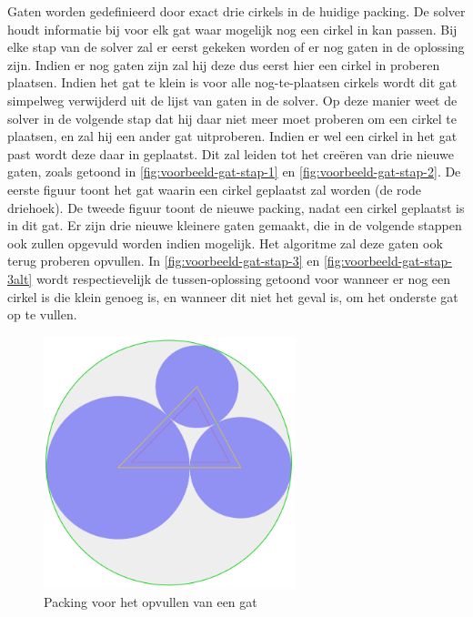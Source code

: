 \documentclass[12pt,a4paper,oneside]{book}
\begin{document}
Gaten worden gedefinieerd door exact drie cirkels in de huidige packing.
De solver houdt informatie bij voor elk gat waar mogelijk nog een cirkel in kan passen.
Bij elke stap van de solver zal er eerst gekeken worden of er nog gaten in de oplossing zijn.
Indien er nog gaten zijn zal hij deze dus eerst hier een cirkel in proberen plaatsen.
Indien het gat te klein is voor alle nog-te-plaatsen cirkels wordt dit gat simpelweg verwijderd uit de lijst van gaten in de solver.
Op deze manier weet de solver in de volgende stap dat hij daar niet meer moet proberen om een cirkel te plaatsen, en zal hij een ander gat uitproberen.
Indien er wel een cirkel in het gat past wordt deze daar in geplaatst.
Dit zal leiden tot het creëren van drie nieuwe gaten, zoals getoond in \autoref{fig:voorbeeld-gat-stap-1} en \autoref{fig:voorbeeld-gat-stap-2}.
De eerste figuur toont het gat waarin een cirkel geplaatst zal worden (de rode driehoek).
De tweede figuur toont de nieuwe packing, nadat een cirkel geplaatst is in dit gat.
Er zijn drie nieuwe kleinere gaten gemaakt, die in de volgende stappen ook zullen opgevuld worden indien mogelijk.
Het algoritme zal deze gaten ook terug proberen opvullen.
In \autoref{fig:voorbeeld-gat-stap-3} en \autoref{fig:voorbeeld-gat-stap-3alt} wordt respectievelijk de tussen-oplossing getoond voor wanneer er nog een cirkel is die klein genoeg is, en wanneer dit niet het geval is, om het onderste gat op te vullen.

\begin{figure}
  \centering
  \includegraphics[width=0.65\textwidth]{voorbeeld-gat-stap-1.png}
  \caption{Packing voor het opvullen van een gat} \label{fig:voorbeeld-gat-stap-1} 
\end{figure}
\end{document}
